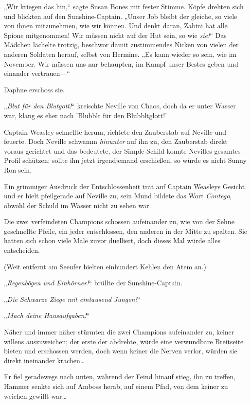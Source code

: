 {„Wir kriegen das hin,“ sagte Susan Bones mit fester Stimme. Köpfe drehten sich und blickten auf den Sunshine-Captain. „Unser Job bleibt der gleiche, so viele von ihnen mitzunehmen, wie wir können. Und denkt daran, Zabini hat alle Spione mitgenommen! Wir müssen nicht auf der Hut sein, so wie \emph{sie!}“ Das Mädchen lächelte trotzig, beschwor damit zustimmendes Nicken von vielen der anderen Soldaten herauf, selbst von Hermine. „Es kann wieder so sein, wie im November. Wir müssen uns nur behaupten, im Kampf unser Bestes geben und einander vertrauen—“

Daphne erschoss sie.

\later

„\emph{Blut für den Blutgott!}“ kreischte Neville von Chaos, doch da er unter Wasser war, klang es eher nach 'Blubblt für den Blubbltglott!'

Captain Weasley schnellte herum, richtete den Zauberstab auf Neville und feuerte. Doch Neville schwamm \emph{hinunter} auf ihn zu, den Zauberstab direkt voraus gerichtet und das bedeutete, der Simple Schild konnte Nevilles gesamtes Profil schützen; sollte ihn jetzt irgendjemand erschießen, so würde es nicht Sunny Ron sein.

Ein grimmiger Ausdruck der Entschlossenheit trat auf Captain Weasleys Gesicht und er hielt pfeilgerade auf Neville zu, sein Mund bildete das Wort \emph{Contego}, obwohl der Schuld im Wasser nicht zu sehen war.

Die zwei verfeindeten Champions schossen aufeinander zu, wie von der Sehne geschnellte Pfeile, ein jeder entschlossen, den anderen in der Mitte zu spalten. Sie hatten sich schon viele Male zuvor duelliert, doch dieses Mal würde alles entscheiden.

(Weit entfernt am Seeufer hielten einhundert Kehlen den Atem an.)

„\emph{Regenbögen und Einhörner!}“ brüllte der Sunshine-Captain.

„\emph{Die Schwarze Ziege mit eintausend Jungen!}“

„\emph{Mach deine Hausaufgaben!}“

Näher und immer näher stürmten die zwei Champions aufeinander zu, keiner willens auszuweichen; der erste der abdrehte, würde eine verwundbare Breitseite bieten und erschossen werden, doch wenn keiner die Nerven verlor, würden sie direkt ineinander krachen…

Er fiel geradewegs nach unten, während der Feind hinauf stieg, ihn zu treffen, Hammer senkte sich auf Amboss herab, auf einem Pfad, von dem keiner zu weichen gewillt war…

}
